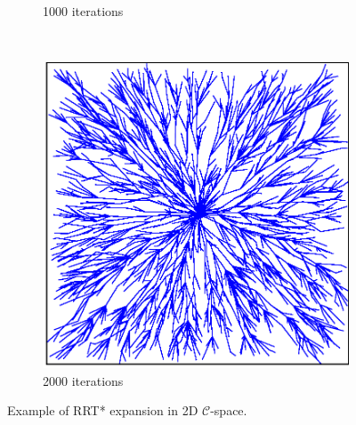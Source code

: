 \documentclass{beamer}
\begin{document}
\begin{frame}
\begin{figure}[!ht]
\begin{subfigure}[b]{0.3\textwidth}
			\caption{1000 iterations}
		\end{subfigure}
		~ %
		\begin{subfigure}[b]{0.302\textwidth}
			\includegraphics[width=\textwidth]{figChap3/RRTstar_expansion2000.eps}
			\caption{2000 iterations}
		\end{subfigure}
		\caption{Example of RRT* expansion in 2D $\mathcal{C}$-space.}
		\label{fig:RRTstargrowing}
	  \end{figure}
    
\end{frame}
\end{document}
